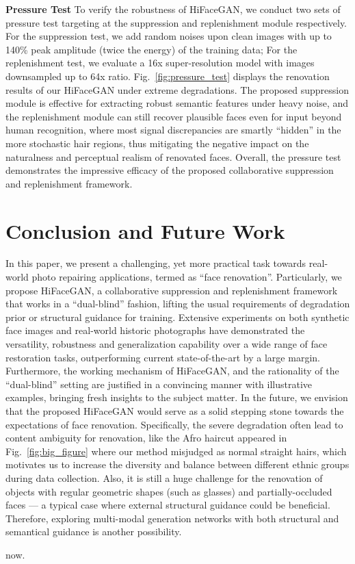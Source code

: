 \documentclass[sigconf]{acmart}
\begin{document}
\textbf{Pressure Test}
To verify the robustness of HiFaceGAN, we conduct two sets of pressure test targeting at the suppression and replenishment module respectively. For the suppression test, we add random noises upon clean images with up to 140\% peak amplitude (twice the energy) of the training data; For the replenishment test, we evaluate a 16x super-resolution model with images downsampled up to 64x ratio. Fig.~\ref{fig:pressure_test} displays the renovation results of our HiFaceGAN under extreme degradations. The proposed suppression module is effective for extracting robust semantic features under heavy noise, and the replenishment module can still recover plausible faces even for input beyond human recognition, where most signal discrepancies are smartly ``hidden'' in the more stochastic hair regions, thus mitigating the negative impact on the naturalness and perceptual realism of renovated faces. Overall, the pressure test demonstrates the impressive efficacy of the proposed collaborative suppression and replenishment framework.





\section{Conclusion and Future Work}
In this paper, we present a challenging, yet more practical task towards real-world photo repairing applications, termed as ``face renovation''. Particularly, we propose HiFaceGAN, a collaborative suppression and replenishment framework that works in a ``dual-blind'' fashion, lifting the usual requirements of degradation prior or structural guidance for training. Extensive experiments on both synthetic face images and real-world historic photographs have demonstrated the versatility, robustness and generalization capability over a wide range of face restoration tasks, outperforming current state-of-the-art by a large margin. Furthermore, the working mechanism of HiFaceGAN, and the rationality of the ``dual-blind'' setting are justified in a convincing manner with illustrative examples, bringing fresh insights to the subject matter.
In the future, we envision that the proposed HiFaceGAN would serve as a solid stepping stone towards the expectations of face renovation. Specifically, the severe degradation often lead to content ambiguity for renovation, like the Afro haircut appeared in Fig.~\ref{fig:big_figure} where our method misjudged as normal straight hairs, which motivates us to increase the diversity and balance between different ethnic groups during data collection. Also, it is still a huge challenge for the renovation of objects with regular geometric shapes (such as glasses) and partially-occluded faces --- a typical case where external structural guidance could be beneficial. Therefore, exploring multi-modal generation networks with both structural and semantical guidance is another possibility.


\begin{acks}
now.
\end{acks}



\end{document}
